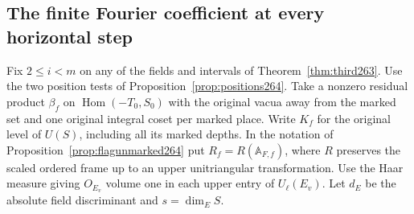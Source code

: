 \documentclass[a4paper,11pt]{article}
\theoremstyle{definition}
\theoremstyle{remark}
\numberwithin{equation}{section}
\begin{document}
\subsection{The finite Fourier coefficient at every horizontal step}\label{nav:VI-41}
Fix \(2\le i<m\) on any of the fields and intervals of
Theorem~\ref{thm:third263}. Use the two position tests of
Proposition~\ref{prop:positions264}. Take a nonzero residual
product \(\beta_f\) on \(\operatorname{Hom}(-T_0,S_0)\) with
the original vacua away from the marked set and one original
integral coset per marked place. Write \(K_f\) for the
original level of \(U(S)\), including all its marked depths.
In the notation of Proposition~\ref{prop:flagunmarked264}
put \(R_f=R(\mathbb A_{F,f})\), where \(R\) preserves the
scaled ordered frame up to an upper unitriangular transformation.
Use the Haar measure giving \(O_{E_v}\) volume one in each
upper entry of \(U_\ell(E_v)\). Let \(d_E\) be the absolute
field discriminant and \(s=\dim_E S\).
\end{document}
